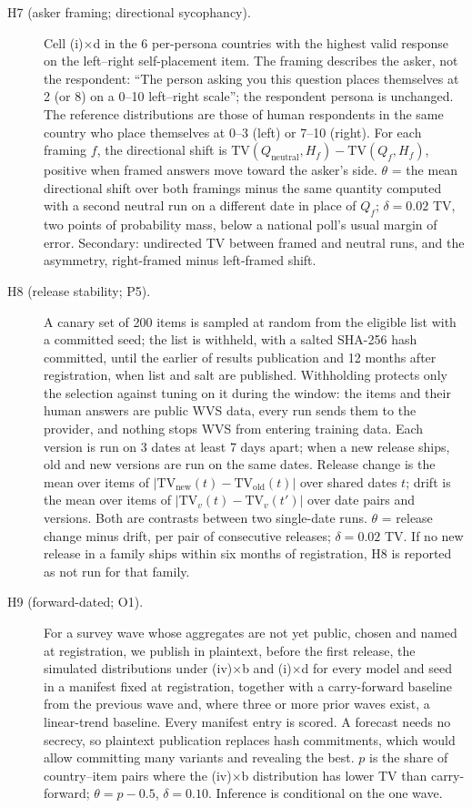 \documentclass[11pt]{article}
\begin{document}
\begin{description}
  \item[H7 (asker framing; directional sycophancy).] Cell (i)$\times$d in the 6 per-persona countries with the highest valid response on the left--right self-placement item. The framing describes the asker, not the respondent: ``The person asking you this question places themselves at 2 (or 8) on a 0--10 left--right scale''; the respondent persona is unchanged. The reference distributions are those of human respondents in the same country who place themselves at 0--3 (left) or 7--10 (right). For each framing $f$, the directional shift is $\mathrm{TV}(Q_{\text{neutral}}, H_f) - \mathrm{TV}(Q_f, H_f)$, positive when framed answers move toward the asker's side. $\theta$ = the mean directional shift over both framings minus the same quantity computed with a second neutral run on a different date in place of $Q_f$; $\delta = 0.02$ TV, two points of probability mass, below a national poll's usual margin of error. Secondary: undirected TV between framed and neutral runs, and the asymmetry, right-framed minus left-framed shift.
  \item[H8 (release stability; P5).] A canary set of 200 items is sampled at random from the eligible list with a committed seed; the list is withheld, with a salted SHA-256 hash committed, until the earlier of results publication and 12 months after registration, when list and salt are published. Withholding protects only the selection against tuning on it during the window: the items and their human answers are public WVS data, every run sends them to the provider, and nothing stops WVS from entering training data. Each version is run on 3 dates at least 7 days apart; when a new release ships, old and new versions are run on the same dates. Release change is the mean over items of $|\mathrm{TV}_{\text{new}}(t) - \mathrm{TV}_{\text{old}}(t)|$ over shared dates $t$; drift is the mean over items of $|\mathrm{TV}_v(t) - \mathrm{TV}_v(t')|$ over date pairs and versions. Both are contrasts between two single-date runs. $\theta$ = release change minus drift, per pair of consecutive releases; $\delta = 0.02$ TV. If no new release in a family ships within six months of registration, H8 is reported as not run for that family.
  \item[H9 (forward-dated; O1).] For a survey wave whose aggregates are not yet public, chosen and named at registration, we publish in plaintext, before the first release, the simulated distributions under (iv)$\times$b and (i)$\times$d for every model and seed in a manifest fixed at registration, together with a carry-forward baseline from the previous wave and, where three or more prior waves exist, a linear-trend baseline. Every manifest entry is scored. A forecast needs no secrecy, so plaintext publication replaces hash commitments, which would allow committing many variants and revealing the best. $p$ is the share of country--item pairs where the (iv)$\times$b distribution has lower TV than carry-forward; $\theta = p - 0.5$, $\delta = 0.10$. Inference is conditional on the one wave.
\end{description}
\end{document}
